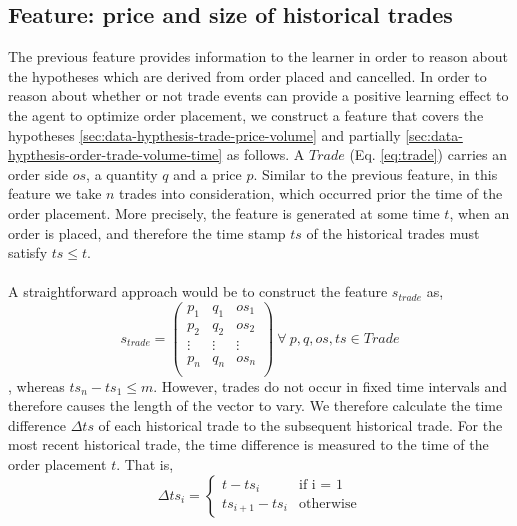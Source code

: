 \subsection{Feature: price and size of historical trades}
The previous feature provides information to the learner in order to reason about the hypotheses which are derived from order placed and cancelled.
In order to reason about whether or not trade events can provide a positive learning effect to the agent to optimize order placement, we construct a feature that covers the hypotheses \ref{sec:data-hypthesis-trade-price-volume} and partially \ref{sec:data-hypthesis-order-trade-volume-time} as follows.
A $Trade$ (Eq. \ref{eq:trade}) carries an order side $os$, a quantity $q$ and a price $p$.
Similar to the previous feature, in this feature we take $n$ trades into consideration, which occurred prior the time of the order placement.
More precisely, the feature is generated at some time $t$, when an order is placed, and therefore the time stamp $ts$ of the historical trades must satisfy $ts \leq t$.
\\
\\
A straightforward approach would be to construct the feature $s_{trade}$ as,
\begin{equation}
    s_{trade} =\begin{pmatrix}
        p_1 & q_1 & os_1 \\
        p_2 & q_2 & os_2 \\
        \vdots & \vdots & \vdots\\
        p_n & q_n & os_n \\
    \end{pmatrix}
    \ \forall \ p, q, os, ts \in Trade
\end{equation}, whereas $ts_n - ts_1 \leq m$.
However, trades do not occur in fixed time intervals and therefore causes the length of the vector to vary.
We therefore calculate the time difference $\Delta{ts}$ of each historical trade to the subsequent historical trade.
For the most recent historical trade, the time difference is measured to the time of the order placement $t$.
That is,
\begin{equation}
    \Delta{ts}_i = \begin{cases}
    t - ts_i &\text{if i = 1}\\
    ts_{i+1} - ts_i &\text{otherwise}
    \end{cases}
\end{equation}

